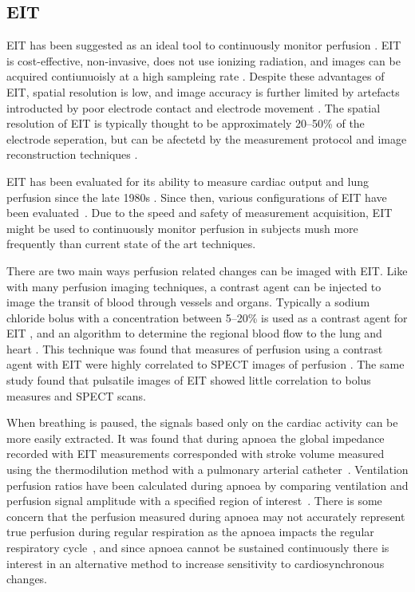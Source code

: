 \subsection{EIT}
EIT has been suggested as an ideal tool to continuously monitor 
perfusion \parencite{leonhardt_electrical_2012}. EIT is cost-effective,
non-invasive, does not use ionizing radiation, and images can be acquired 
contiunuoisly at a high sampleing rate \parencite{adler_electrical_2017}.
Despite these advantages of EIT, 
spatial resolution is low, and image accuracy is further limited by 
artefacts introducted by poor electrode contact and electrode 
movement \parencite{adler_electrical_2017}.
The spatial resolution of EIT is typically thought to be approximately 20--50\% 
of the electrode seperation, but can be afectetd by the measurement protocol 
and image reconstruction techniques \parencite{polydorides_electrode_2002}.

EIT has been evaluated for its ability to measure cardiac output and
lung perfusion since the late 1980s
\parencite{eyuboglu_vivo_1989,zadehkoochak_pulmonary_1992,brown_blood_1992,frerichs_regional_2002}.
Since then, various configurations of EIT have been 
evaluated~\parencite{borges_regional_2012,nguyen_perfusion_2015}.
Due to the speed and safety of measurement acquisition, EIT might be used to continuously monitor 
perfusion in subjects mush more frequently than current state of the art techniques.

There are two main ways perfusion related changes can be imaged with EIT. Like with many 
perfusion imaging techniques, a contrast agent can be injected to image the transit 
of blood through vessels and organs.
Typically a sodium chloride bolus with a concentration between 
5--20\% is used as a contrast agent for EIT \parencite{nguyen_review_2012}, 
and an algorithm to determine the regional blood flow to the lung and heart
\parencite{borges_regional_2012}. This technique was found that measures of perfusion 
using a contrast agent with EIT were highly correlated to SPECT images of perfusion
\parencite{borges_regional_2012}.
The same study found that pulsatile images of EIT showed little correlation to bolus measures 
and SPECT scans. 

When breathing is paused, the signals based only on 
the cardiac activity can be more easily extracted. 
It was found that during apnoea the global impedance 
recorded with EIT measurements corresponded with stroke volume 
measured using the 
thermodilution method with a pulmonary arterial 
catheter~\parencite{fagerberg_electrical_2009}.
Ventilation perfusion ratios have been calculated during apnoea by comparing 
ventilation and perfusion signal amplitude with a specified region of 
interest~\parencite{fagerberg_electrical_2009}.
There is some concern that the perfusion measured 
during apnoea may not accurately represent 
true perfusion during regular respiration as the apnoea 
impacts the regular respiratory cycle~\parencite{leonhardt_electrical_2012}, and since 
apnoea cannot be sustained continuously there is interest in an alternative method 
to increase sensitivity to cardiosynchronous changes. 

